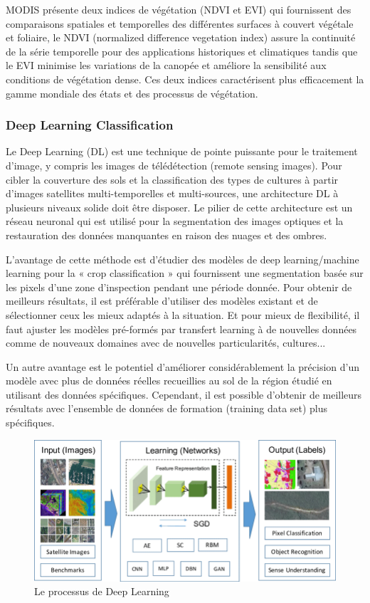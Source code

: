 \documentclass[12pt, openany]{report}
\begin{document}
MODIS présente deux indices de végétation (NDVI et EVI) qui fournissent des comparaisons spatiales et temporelles des différentes surfaces à couvert végétale et foliaire, le NDVI (normalized difference vegetation index) assure la continuité de la série temporelle pour des applications historiques et climatiques tandis que le EVI minimise les variations de la canopée et améliore la sensibilité aux conditions de végétation dense.
Ces deux indices caractérisent plus efficacement la gamme mondiale des états et des processus de végétation. \cite{modis}

\subsubsection{Deep Learning Classification}
Le Deep Learning (DL) est une technique de pointe puissante pour le traitement d'image, y compris les images de télédétection (remote sensing images). 
Pour cibler la couverture des sols et la classification des types de cultures à partir d'images satellites multi-temporelles et multi-sources, une architecture DL à plusieurs niveaux solide doit être disposer. 
Le pilier de cette architecture est un réseau neuronal qui est utilisé pour la segmentation des images optiques et la restauration des données manquantes en raison des nuages et des ombres. \cite{deeplearning}

L’avantage de cette méthode est d’étudier des modèles de deep learning/machine learning pour la « crop classification » qui fournissent une segmentation basée sur les pixels d'une zone d'inspection pendant une période donnée. Pour obtenir de meilleurs résultats, il est préférable d’utiliser des modèles existant et de sélectionner ceux les mieux adaptés à la situation. Et pour mieux de flexibilité, il faut ajuster les modèles pré-formés par transfert learning à de nouvelles données comme de nouveaux domaines avec de nouvelles particularités, cultures...

Un autre avantage est le potentiel d'améliorer considérablement la précision d'un modèle avec plus de données réelles recueillies au sol de la région étudié en utilisant des données spécifiques. Cependant, il est possible d'obtenir de meilleurs résultats avec l'ensemble de données de formation (training data set) plus spécifiques.

\begin{figure}[h]
\centering
\includegraphics[scale=0.5]{deep.png}
\caption{Le processus de Deep Learning}
\end{figure}
\end{document}
